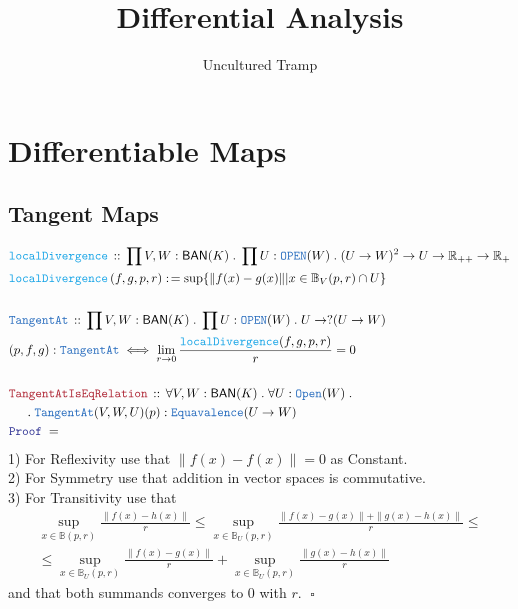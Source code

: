 \documentclass[12pt]{scrartcl}
\author{Uncultured Tramp}
\title{Differential Analysis}
\newcommand{\TYPE}[1]{\textcolor{NavyBlue}{\mathtt{#1}}}
\newcommand{\FUNC}[1]{\textcolor{Cerulean}{\mathtt{#1}}}
\newcommand{\LOGIC}[1]{\textcolor{Blue}{\mathtt{#1}}}
\newcommand{\THM}[1]{\textcolor{Maroon}{\mathtt{#1}}}
\renewcommand{\.}{\; . \;}
\newcommand{\de}{: \kern 0.1pc =}
\newcommand{\Act}[1]{\left( #1 \right)}
\newcommand{\Theorem}[2]{& \THM{#1} \, :: \, #2 \\ & \Proof = \\ }
\newcommand{\DeclareType}[2]{& \TYPE{#1} \, :: \, #2 \\}
\newcommand{\DefineType}[3]{& #1 : \TYPE{#2} \iff #3 \\}
\newcommand{\DeclareFunc}[2]{& \FUNC{#1} \, :: \, #2 \\}
\newcommand{\DefineFunc}[3]{&  \FUNC{#1}\Act{#2} \de #3 \\}
\newcommand{\NewLine}{\\ & \kern 1pc}
\newcommand{\Page}[1]{\begin{align*} #1 \end{align*}   }
\newcommand{\Reals}{\mathbb{R} }
\newcommand{\QED}{\; \square}
\newcommand{\Proof}{\LOGIC{Proof} \; }
\newcommand{\Ball}{ \mathbb{B} }
\newcommand{\BAN}{\mathsf{BAN}} %
\begin{document}
\maketitle
\newpage
\tableofcontents
\newpage
\section{Differentiable Maps}
\subsection{Tangent Maps}
\Page{
\DeclareFunc{localDivergence }{ \prod V,W : \BAN(K) \. \prod U : \TYPE{OPEN}(W) \. (U \to W)^2 \to U \to \Reals_{++} \to \Reals_{+}  }
\DefineFunc{localDivergence}{ f,g,p,r }{    \sup \{ \| f(x) - g(x) \| | x \in \Ball_V (p,r) \cap U   \}  }
\\
\DeclareType{TangentAt}{\prod V,W : \BAN(K) \. \prod U : \TYPE{OPEN}(W) \. U \to ?(U \to W)}
\DefineType{(p,f,g)}{TangentAt}{\lim_{ r \to 0}  \frac{ \FUNC{localDivergence}(f,g,p,r) }{r} = 0}
\\
\Theorem{TangentAtIsEqRelation}{\forall V,W : \BAN(K) \. \forall U : \TYPE{Open}(W) \. 
\NewLine \.
\TYPE{TangentAt}(V,W,U)(p) : \TYPE{Equavalence}(U \to W)}
}
1) For Reflexivity use that  $\| f(x) - f(x) \| = 0$ as Constant. \\
2) For Symmetry use that addition in vector spaces is commutative. \\
3) For Transitivity use that
\begin{multline*}
\sup_{x \in \mathbb{B}(p,r)} \frac{\| f(x) - h(x) \|}{r} \le \sup_{x \in \Ball_U(p,r)} \frac{\| f(x) -g(x)\| + \| g(x) - h(x)\| }{r} \le
\\
\le \sup_{x \in \Ball_U(p,r)} \frac{ \| f(x) - g(x) \| }{r} + \sup_{x \in \Ball_U(p,r)} \frac{\| g(x) - h(x) \|}{r}
\end{multline*}
and that both summands converges to $0$ with $r$.
$\QED$
\newpage
\end{document}
